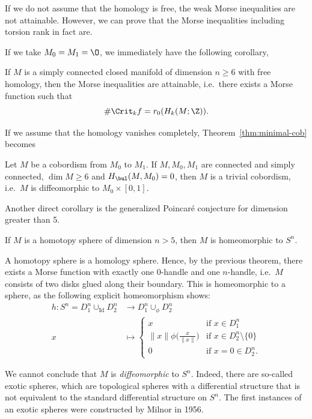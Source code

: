\begin{remark}
    If we do not assume that the homology is free, the weak Morse inequalities are not attainable.
    However, we can prove that the Morse inequalities including torsion rank in fact are.
\end{remark}

If we take $ M_0 = M_1 = \O$, we immediately have the following corollary,
\begin{corollary}
    If $M$ is a simply connected closed manifold of dimension  $n \ge 6$ with free homology, then the Morse inequalities are attainable, i.e.\ there exists a Morse function such that
    \[
        \# \Crit_kf = r_0 (H_k(M; \Z))
    .\] 
\end{corollary}

If we assume that the homology vanishes completely,
Theorem~\ref{thm:minimal-cob} becomes
\begin{corollary}
    Let $M$ be a cobordism from  $M_0$ to $M_1$.
    If $M, M_0, M_1$ are connected and simply connected, $\dim M \ge  6$ and $H_{\bul}(M, M_0) = 0$, then $M$ is a trivial cobordism, i.e.\ $M$ is diffeomorphic to $M_0 \times [0,1]$.
\end{corollary}

Another direct corollary is the generalized Poincaré conjecture for dimension greater than 5.

\begin{corollary}
    If $M$ is a homotopy sphere of dimension  $n >  5$, then $M$ is homeomorphic to  $S^{n}$.
\end{corollary}
\begin{myproof}
    A homotopy sphere is a homology sphere.
    Hence, by the previous theorem, there exists a Morse function with exactly one $0$-handle and one $n$-handle, i.e.\ $M$ consists of two disks glued along their boundary. This is homeomorphic to a sphere, as the following explicit homeomorphism shows:
    \begin{align*}
        h: S^{n} = D_1^{n} \cup_\text{Id}  D_2^{n} &\longrightarrow D_1^{n} \cup_\phi D_2^{n} \\
         x &\longmapsto 
         \begin{cases}
             x & \text{if $x \in D_1^{n}$}\\
             \|x\| \phi\Big(\frac{x}{\|x\|}\Big) & \text{if $x \in D_2 ^{n} \setminus \{0\} $}\\
             0 & \text{if $x = 0 \in D_2^{n}$.} 
         \end{cases}
    \end{align*}
\end{myproof}
\begin{remark}
    We cannot conclude that $M$ is \emph{diffeomorphic} to $S^{n}$.
    Indeed, there are so-called exotic spheres, which are topological spheres with a differential structure that is not equivalent to the standard differential structure on $S^{n}$.
    The first instances of an exotic spheres were constructed by Milnor in 1956.
\end{remark}

